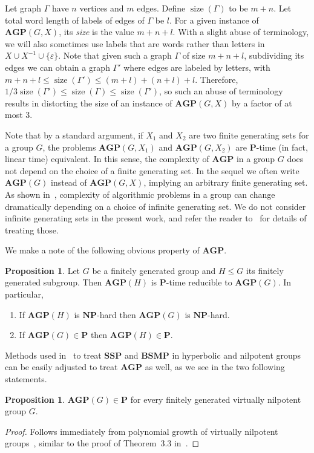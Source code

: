 \documentclass[10pt]{amsart}
\theoremstyle{definition}
\newtheorem{proposition}[theorem]{Proposition}
\DeclareMathOperator{\size}{{size}}
\def\P{{\mathbf{P}}}
\def\NP{{\mathbf{NP}}}
\def\SSP{{\mathbf{SSP}}}
\def\BSMP{{\mathbf{BSMP}}}
\def\AGP{{\mathbf{AGP}}}
\begin{document}
\medskip
Let graph $\Gamma$ have $n$ vertices and $m$ edges. Define $\size(\Gamma)$ to be $m+n$. Let total word length of labels of edges of $\Gamma$ be $l$. For a given instance of $\AGP(G,X)$, its {\em size} is the value $m+n+l$. With a slight abuse of terminology, we will also sometimes use labels that are words rather than letters in $X\cup X^{-1}\cup\{\varepsilon\}$. Note that given such a graph $\Gamma$ of size $m+n+l$, subdividing its edges we can obtain a graph $\Gamma'$ where edges are labeled by letters, with $m+n+l\le \size(\Gamma')\le (m+l)+(n+l)+l$. Therefore, $1/3\size(\Gamma')\le\size(\Gamma)\le \size(\Gamma')$, so such an abuse of terminology results in distorting the size of an instance of $\AGP(G,X)$ by a factor of at most $3$.

Note that by a standard argument, if $X_1$ and $X_2$ are two finite generating sets for a group $G$, the problems $\AGP(G,X_1)$ and $\AGP(G,X_2)$ are $\P$-time (in fact, linear time) equivalent. In this sense, the complexity  of $\AGP$ in a group $G$ does not depend on the choice of a finite generating set. In the sequel we often write $\AGP(G)$ instead of $\AGP(G,X)$, implying an arbitrary finite generating set.
As shown in~\cite{Miasnikov-Nikolaev-Ushakov:2014a}, complexity of algorithmic problems in a group can change dramatically depending on a choice of infinite generating set. We do not consider infinite generating sets in the present work, and refer the reader to~\cite{Miasnikov-Nikolaev-Ushakov:2014a} for details of treating those.

We make a note of the following obvious property of $\AGP$.

\begin{proposition}\label{pr:subgroup}
Let $G$ be a finitely generated group and $H\le G$ its finitely generated subgroup. Then $\AGP(H)$ is $\P$-time reducible to $\AGP(G)$. In particular,
\begin{enumerate}
\item If $\AGP(H)$ is $\NP$-hard then $\AGP(G)$ is $\NP$-hard.
\item If $\AGP(G)\in \P$ then $\AGP(H)\in \P$.
\end{enumerate}
\end{proposition}

Methods used in~\cite{Miasnikov-Nikolaev-Ushakov:2014a} to treat $\SSP$ and $\BSMP$ in hyperbolic and nilpotent groups can be easily adjusted to treat $\AGP$ as well, as we see in the two following statements.
\begin{proposition}\label{pr:agp_nilp}
$\AGP(G)\in\P$ for every finitely generated virtually nilpotent group $G$.
\end{proposition}
\begin{proof}
Follows immediately from polynomial growth of virtually nilpotent groups~\cite{Wolf}, similar to the proof of Theorem~3.3 in~\cite{Miasnikov-Nikolaev-Ushakov:2014a}.
\end{proof}
\end{document}
